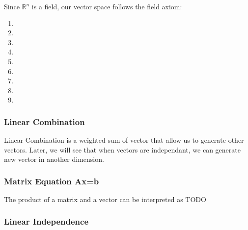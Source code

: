 \documentclass{article}
\begin{document}
Since $\mathbb{R}^n$ is a field, our vector space follows the field axiom:

\begin{enumerate}
    \item
    \item
    \item
    \item
    \item
    \item
    \item
    \item
    \item
\end{enumerate}

\subsubsection{Linear Combination}

Linear Combination is a weighted sum of vector that allow us to generate other
vectors. Later, we will see that when vectors are independant, we can generate
new vector in another dimension.

\begin{definition}
\end{definition}

\begin{definition}[Span]
\end{definition}

\subsubsection{Matrix Equation Ax=b}

\begin{definition}[Computation of Ax]
    The product of a matrix and a vector can be interpreted as TODO
\end{definition}

\begin{theorem}

\end{theorem}

\begin{definition}
\end{definition}

\subsubsection{Linear Independence}
\end{document}
